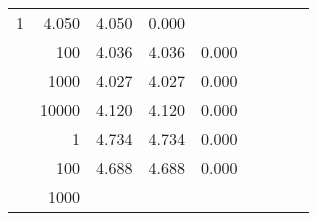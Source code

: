 \begin{table}
\begin{tabular}{rrrrrrrrr}
					\multirow{ 1 }{*}{ 1 } &
					
						
							    
							    
	                           4.050 & 4.050 & 0.000  \\
	                
	            
					 &  
					 
					\multirow{ 1 }{*}{ 100 } &
					
						
							    
							    
	                           4.036 & 4.036 & 0.000  \\
	                
	            
					 &  
					 
					\multirow{ 1 }{*}{ 1000 } &
					
						
							    
							    
	                           4.027 & 4.027 & 0.000  \\
	                
	            
					 &  
					 
					\multirow{ 1 }{*}{ 10000 } &
					
						
							    
							    
	                           4.120 & 4.120 & 0.000  \\
	                
	            
	        
				\noalign{\smallskip}\hline
				\multirow{ 4 }{*}{ 160000 } &
				
					
					 
					\multirow{ 1 }{*}{ 1 } &
					
						
							    
							    
	                           4.734 & 4.734 & 0.000  \\
	                
	            
					 &  
					 
					\multirow{ 1 }{*}{ 100 } &
					
						
							    
							    
	                           4.688 & 4.688 & 0.000  \\
	                
	            
					 &  
					 
					\multirow{ 1 }{*}{ 1000 } &
					
						
							    

\end{tabular}
\end{table}
